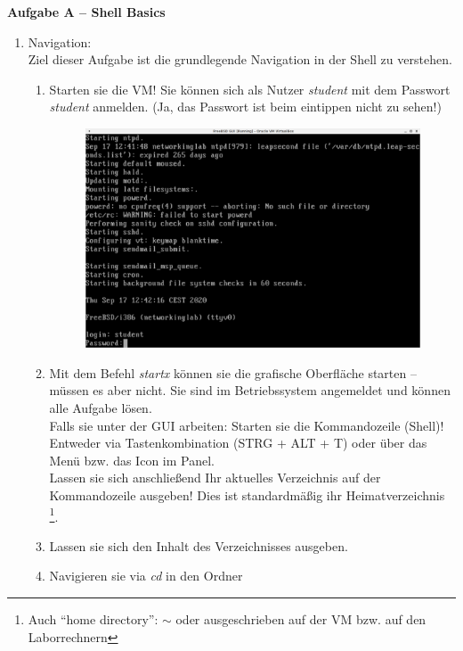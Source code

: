 \documentclass[paper=a4,fontsize=11pt]{scrartcl}%
\numberwithin{equation}{section}
\begin{document}
\begin{center}\Large{\textbf{Aufgabe A -- Shell Basics}}\end{center}\vskip0.25in
\begin{enumerate}
\item Navigation:\\
Ziel dieser Aufgabe ist die grundlegende Navigation in der Shell zu verstehen.
\begin{enumerate}[label=(\alph*)]
		\item Starten sie die VM! Sie können sich als Nutzer \emph{student} mit dem Passwort \emph{student} anmelden. (Ja, das Passwort ist beim eintippen nicht zu sehen!)
		\begin{figure}[h]
		\centering
		\includegraphics[scale=0.3]{freebsd_login}
		\end{figure}
		\item Mit dem Befehl \emph{startx} können sie die grafische Oberfläche starten -- müssen es aber nicht. Sie sind im Betriebssystem angemeldet und können alle Aufgabe lösen.\\
		Falls sie unter der GUI arbeiten: Starten sie die Kommandozeile (Shell)! Entweder via Tastenkombination  (STRG + ALT + T) oder über das Menü bzw. das Icon im Panel.\\
		Lassen sie sich anschließend Ihr aktuelles Verzeichnis auf der Kommandozeile ausgeben! Dies ist standardmäßig ihr Heimatverzeichnis \footnote{Auch \enquote{home directory}: $\sim$ oder ausgeschrieben  auf der VM bzw.  auf den Laborrechnern}.
		\item Lassen sie sich den Inhalt des Verzeichnisses ausgeben.
		\item Navigieren sie via \emph{cd} in den Ordner 

\end{enumerate}
\end{enumerate}
\end{document}
